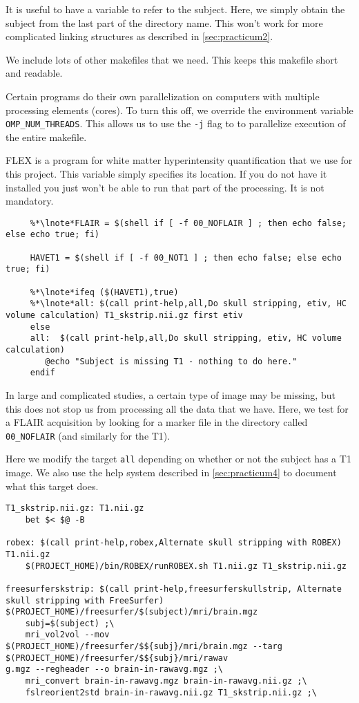  It is useful to have a variable to refer to the
subject. Here, we simply obtain the subject from the last part of the
directory name. This won't work for more complicated linking
structures as described in \autoref{sec:practicum2}. 

 We include lots of other makefiles that we need. This keeps
this makefile short and readable. 

 Certain programs do their own parallelization on computers
with multiple processing elements (cores). To turn this off, we
override the environment variable \texttt{OMP_NUM_THREADS}. This
allows us to use the \texttt{-j} flag to \maken{} to parallelize
execution of the entire makefile.

 FLEX is a program for white matter hyperintensity
quantification that we use for this project. This variable simply
specifies its location. If you do not have it installed you just won't
be able to run that part of the processing. It is not mandatory. 

\begin{lstlisting}
	 %*\lnote*FLAIR = $(shell if [ -f 00_NOFLAIR ] ; then echo false; else echo true; fi)

	 HAVET1 = $(shell if [ -f 00_NOT1 ] ; then echo false; else echo true; fi)

	 %*\lnote*ifeq ($(HAVET1),true)
	 %*\lnote*all: $(call print-help,all,Do skull stripping, etiv, HC volume calculation) T1_skstrip.nii.gz first etiv
	 else
	 all:  $(call print-help,all,Do skull stripping, etiv, HC volume calculation)
		@echo "Subject is missing T1 - nothing to do here."
	 endif
\end{lstlisting}

 In large and complicated studies, a certain type of image may
be missing, but this does not stop us from processing all the data
that we have. Here, we test for a FLAIR acquisition by looking for a
marker file in the directory called \texttt{00_NOFLAIR} (and similarly
for the T1). 

 Here we modify the target \texttt{all} depending on whether
or not the subject has a T1 image. We also use the help system
described in \autoref{sec:practicum4} to document what this target
does. 


\begin{lstlisting}
T1_skstrip.nii.gz: T1.nii.gz 
	bet $< $@ -B

robex: $(call print-help,robex,Alternate skull stripping with ROBEX) T1.nii.gz 
	$(PROJECT_HOME)/bin/ROBEX/runROBEX.sh T1.nii.gz T1_skstrip.nii.gz

freesurferskstrip: $(call print-help,freesurferskullstrip, Alternate skull stripping with FreeSurfer) $(PROJECT_HOME)/freesurfer/$(subject)/mri/brain.mgz
	subj=$(subject) ;\
	mri_vol2vol --mov $(PROJECT_HOME)/freesurfer/$${subj}/mri/brain.mgz --targ $(PROJECT_HOME)/freesurfer/$${subj}/mri/rawav
g.mgz --regheader --o brain-in-rawavg.mgz ;\
	mri_convert brain-in-rawavg.mgz brain-in-rawavg.nii.gz ;\
	fslreorient2std brain-in-rawavg.nii.gz T1_skstrip.nii.gz ;\
\end{lstlisting}

